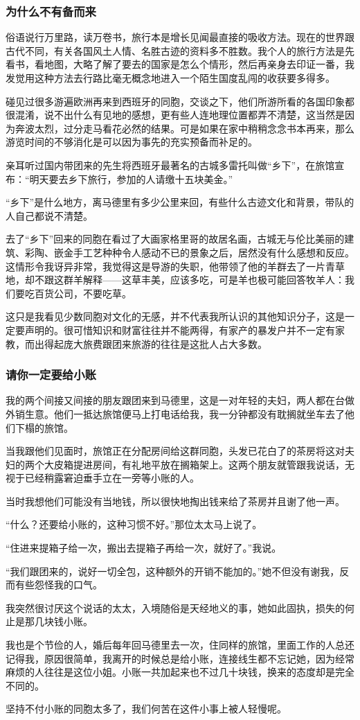 \subsubsection*{为什么不有备而来}
\par 俗语说行万里路，读万卷书，旅行本是增长见闻最直接的吸收方法。现在的世界跟古代不同，有关各国风土人情、名胜古迹的资料多不胜数。我个人的旅行方法是先看书，看地图，大略了解了要去的国家是怎么个情形，然后再亲身去印证一番，我发觉用这种方法去行路比毫无概念地进入一个陌生国度乱闯的收获要多得多。
\par 碰见过很多游遍欧洲再来到西班牙的同胞，交谈之下，他们所游所看的各国印象都很混淆，说不出什么有见地的感想，更有些人连地理位置都弄不清楚，这当然是因为奔波太烈，过分走马看花必然的结果。可是如果在家中稍稍念念书本再来，那么游览时间的不够消化是可以因为事先的充实预备而补足的。
\par 亲耳听过国内带团来的先生将西班牙最著名的古城多雷托叫做“乡下”，在旅馆宣布：“明天要去乡下旅行，参加的人请缴十五块美金。”
\par “乡下”是什么地方，离马德里有多少公里来回，有些什么古迹文化和背景，带队的人自己都说不清楚。
\par 去了“乡下”回来的同胞在看过了大画家格里哥的故居名画，古城无与伦比美丽的建筑、彩陶、嵌金手工艺种种令人感动不已的景象之后，居然没有什么感想和反应。这情形令我讶异非常，我觉得这是导游的失职，他带领了他的羊群去了一片青草地，却不跟这群羊解释——这草丰美，应该多吃，可是羊也极可能回答牧羊人：我们要吃百货公司，不要吃草。
\par 这只是我看见少数同胞对文化的无感，并不代表我所认识的其他知识分子，这是一定要声明的。很可惜知识和财富往往并不能两得，有家产的暴发户并不一定有家教，而出得起庞大旅费跟团来旅游的往往是这批人占大多数。
\subsubsection*{请你一定要给小账}
\par 我的两个间接又间接的朋友跟团来到马德里，这是一对年轻的夫妇，两人都在台做外销生意。他们一抵达旅馆便马上打电话给我，我一分钟都没有耽搁就坐车去了他们下榻的旅馆。
\par 当我跟他们见面时，旅馆正在分配房间给这群同胞，头发已花白了的茶房将这对夫妇的两个大皮箱提进房间，有礼地平放在搁箱架上。这两个朋友就管跟我说话，无视于已经稍露窘迫垂手立在一旁等小账的人。
\par 当时我想他们可能没有当地钱，所以很快地掏出钱来给了茶房并且谢了他一声。
\par “什么？还要给小账的，这种习惯不好。”那位太太马上说了。
\par “住进来提箱子给一次，搬出去提箱子再给一次，就好了。”我说。
\par “我们跟团来的，说好一切全包，这种额外的开销不能加的。”她不但没有谢我，反而有些怨怪我的口气。
\par 我突然很讨厌这个说话的太太，入境随俗是天经地义的事，她如此固执，损失的何止是那几块钱小账。
\par 我也是个节俭的人，婚后每年回马德里去一次，住同样的旅馆，里面工作的人总还记得我，原因很简单，我离开的时候总是给小账，连接线生都不忘记她，因为经常麻烦的人往往是这位小姐。小账一共加起来也不过几十块钱，换来的态度却是完全不同的。
\par 坚持不付小账的同胞太多了，我们何苦在这件小事上被人轻慢呢。
